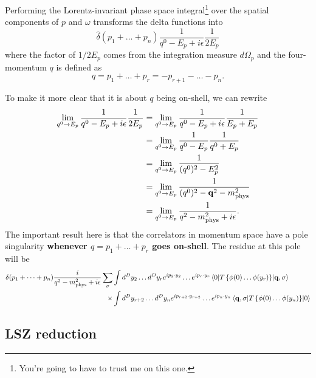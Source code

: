 \documentclass{article}
\numberwithin{equation}{section}
\begin{document}
Performing the Lorentz-invariant phase space integral\footnote{You're going to have to trust me on this one.} %
over the spatial components of $p$ and $\omega$ transforms the delta functions into
\begin{equation}
    \hat{\delta}(p_1 + \dots + p_n) \frac{1}{q^0 - E_p + i\epsilon}\frac{1}{2E_p}
\end{equation}
where the factor of $1/2E_p$ comes from the integration measure $d\Omega_p$ and the four-momentum $q$ is defined as 
\begin{equation}
    q = p_1 + \dots + p_r = -p_{r+1} - \dots - p_n.
\end{equation}


To make it more clear that it is about $q$ being on-shell, we can rewrite
\begin{equation}
\begin{aligned}
    \lim_{q^0 \rightarrow E_p} \frac{1}{q^0 - E_p + i\epsilon}\frac{1}{2E_p} &= \lim_{q^0 \rightarrow E_p} \frac{1}{q^0 - E_p + i\epsilon}\frac{1}{E_p + E_p} \\
    &= \lim_{q^0 \rightarrow E_p} \frac{1}{q^0 - E_p}\frac{1}{q^0 + E_p} \\
    &= \lim_{q^0 \rightarrow E_p} \frac{1}{(q^0)^2 - E_p^2} \\
    &= \lim_{q^0 \rightarrow E_p} \frac{1}{(q^0)^2 - \vb{q}^2 - m_{\text{phys}}^2} \\
    &= \lim_{q^0 \rightarrow E_p} \frac{1}{q^2 - m_{\text{phys}}^2 + i\epsilon}.
\end{aligned}
\end{equation}
The important result here is that the correlators in momentum space have a pole singularity \textbf{whenever $q=p_1 + \dots + p_r$ goes on-shell}.
The residue at this pole will be 
\begin{equation}
\begin{aligned}
    \delta(p_1 + \dots + p_n) \frac{i}{q^2 - m_{\text{phys}}^2 + i\epsilon} \sum_\sigma &\int d^Dy_2 \dots d^Dy_r e^{ip_2 \cdot y_2} \dots e^{ip_r \cdot y_r} \mel{0}{T\left\{\phi(0) \dots \phi(y_r)\right\} }{\vb{q}, \sigma} \\
    \times &\int d^Dy_{r+2} \dots d^Dy_n e^{ip_{r+2} \cdot y_{r+2}} \dots e^{ip_n \cdot y_n} \mel{\vb{q}, \sigma}{T \left\{\phi(0) \dots \phi(y_n)\right\}}{0}
\end{aligned}
\end{equation}

\subsection{LSZ reduction}
\end{document}
